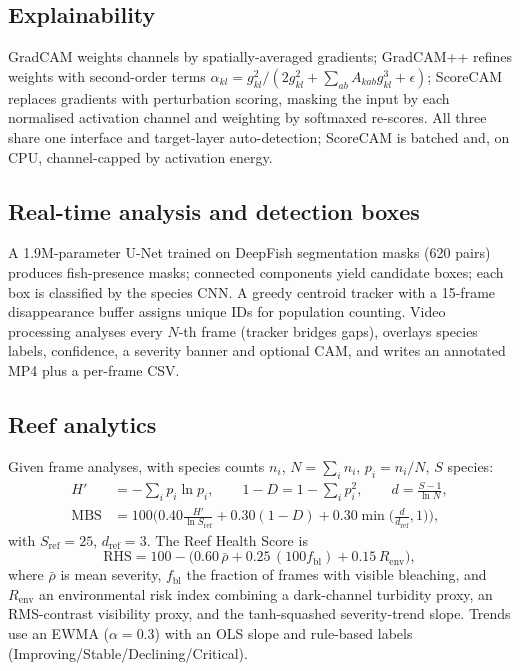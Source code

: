 \documentclass[conference]{IEEEtran}
\begin{document}
\subsection{Explainability}
GradCAM weights channels by spatially-averaged gradients; GradCAM++ refines weights with second-order terms
$\alpha_{kl}=g_{kl}^2 / (2g_{kl}^2 + \sum_{ab}A_{kab}g_{kl}^3 + \epsilon)$; ScoreCAM replaces gradients with perturbation scoring, masking the input by each normalised activation channel and weighting by softmaxed re-scores. All three share one interface and target-layer auto-detection; ScoreCAM is batched and, on CPU, channel-capped by activation energy.

\subsection{Real-time analysis and detection boxes}
A 1.9M-parameter U-Net \cite{ronneberger2015unet} trained on DeepFish segmentation masks (620 pairs) produces fish-presence masks; connected components yield candidate boxes; each box is classified by the species CNN. A greedy centroid tracker with a 15-frame disappearance buffer assigns unique IDs for population counting. Video processing analyses every $N$-th frame (tracker bridges gaps), overlays species labels, confidence, a severity banner and optional CAM, and writes an annotated MP4 plus a per-frame CSV.

\subsection{Reef analytics}
Given frame analyses, with species counts $n_i$, $N=\sum_i n_i$, $p_i=n_i/N$, $S$ species:
\begin{align}
H' &= -\sum_i p_i \ln p_i, \qquad 1-D = 1-\sum_i p_i^2, \qquad d = \frac{S-1}{\ln N},\\
\mathrm{MBS} &= 100\Big(0.40\tfrac{H'}{\ln S_{\mathrm{ref}}} + 0.30(1-D) + 0.30\min\big(\tfrac{d}{d_{\mathrm{ref}}},1\big)\Big),
\label{eq:mbs}
\end{align}
with $S_{\mathrm{ref}}{=}25$, $d_{\mathrm{ref}}{=}3$. The Reef Health Score is
\begin{equation}
\mathrm{RHS} = 100 - \big(0.60\,\bar\rho + 0.25\,(100 f_{\mathrm{bl}}) + 0.15\,R_{\mathrm{env}}\big),
\label{eq:rhs}
\end{equation}
where $\bar\rho$ is mean severity, $f_{\mathrm{bl}}$ the fraction of frames with visible bleaching, and $R_{\mathrm{env}}$ an environmental risk index combining a dark-channel turbidity proxy, an RMS-contrast visibility proxy, and the tanh-squashed severity-trend slope. Trends use an EWMA ($\alpha{=}0.3$) with an OLS slope and rule-based labels (Improving/Stable/Declining/Critical).
\end{document}
